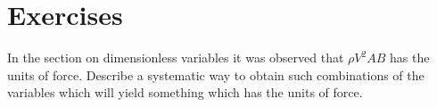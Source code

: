 \section*{Exercises}

\begin{enumialphparenastyle}

\begin{ex} In the section on dimensionless variables 
it was observed that $\rho V^{2}AB$ has the units of force. Describe a
systematic way to obtain such combinations of the variables which will yield
something which has the units of force.
\end{ex}

\end{enumialphparenastyle}
